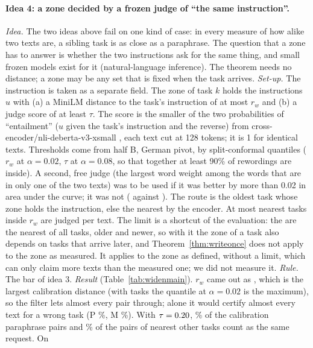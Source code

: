 \paragraph{Idea 4: a zone decided by a frozen judge of ``the same instruction''.}
\emph{Idea.} The two ideas above fail on one kind of case: in every measure of how alike two texts
are, a sibling task is as close as a paraphrase. The question that a zone has to answer is whether the
two instructions ask for the same thing, and small frozen models exist for it (natural-language
inference). The theorem needs no distance; a zone may be any set that is fixed when the task
arrives. \emph{Set-up.} The instruction is taken as a separate field. The zone of task $k$ holds the
instructions $u$ with (a) a MiniLM distance to the task's instruction of at most $r_w$ and (b) a judge
score of at least $\tau$. The score is the smaller of the two probabilities of ``entailment''
($u$ given the task's instruction and the reverse) from cross-encoder/nli-deberta-v3-xsmall
\citep{he2023debertav3}, each text cut at 128 tokens; it is 1 for identical texts. Thresholds come from
half B, German pivot, by split-conformal quantiles ($r_w$ at $\alpha = 0.02$, $\tau$ at
$\alpha = 0.08$, so that together at least 90\% of rewordings are inside). A second, free judge (the
largest word weight among the words that are in only one of the two texts) was to be used if it was better by more than 0.02 in area
under the curve; it was not (\WidenJudgeAucFree{} against \WidenJudgeAucNli{}). The route is the oldest task
whose zone holds the instruction, else the nearest by the encoder. At most \WidenJudgeLimit{} nearest tasks inside $r_w$ are
judged per text. The limit is a shortcut of the evaluation: the \WidenJudgeLimit{} are the nearest of all \WidenTasksEval{} tasks, older and newer, so with it the zone of a task also depends on tasks that arrive later, and
Theorem~\ref{thm:writeonce} does not apply to the zone as measured. It applies to the zone as defined, without a limit, which can only claim more texts than the measured one; we did not measure it. \emph{Rule.} The bar of idea 3.
\emph{Result} (Table~\ref{tab:widenmain}). $r_w$ came out as \WidenJudgeRw{}, which is the largest calibration distance (with \WidenHalfB{} tasks the
quantile at $\alpha = 0.02$ is the maximum), so the filter lets almost every pair through; alone it would certify
almost every text for a wrong task (\textsf{P} \WidenJudgeFilterOnlyP{}\%, \textsf{M} \WidenJudgeFilterOnlyM{}\%). With $\tau = 0.20{}$,
\WidenJudgePosSame{}\% of the calibration paraphrase pairs and \WidenJudgeNegSame{}\% of the pairs of nearest other tasks count as the same request. On
